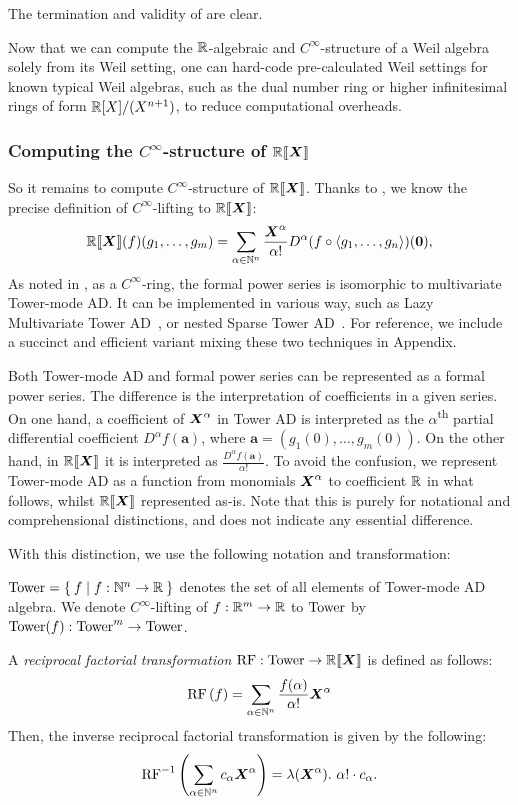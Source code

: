 \documentclass[%
  sigconf,authorversion,screen]{acmart}
\begin{document}
The termination and validity of  are clear.

Now that we can compute the $\mathbb{R}$-algebraic and $C^\infty$-structure of a Weil algebra solely from its Weil setting, one can hard-code pre-calculated Weil settings for known typical Weil algebras, such as the dual number ring or higher infinitesimal rings of form $\mathbb{R}[X]/(X^{n+1})$, to reduce computational overheads.

\subsubsection{Computing the $C^\infty$-structure of $\mathord{\mathbb{R}\llbracket\boldsymbol{X}\rrbracket}$}\label{sec:power-series-lifting}
So it remains to compute $C^\infty$-structure of $\mathord{\mathbb{R}\llbracket\boldsymbol{X}\rrbracket}$.
Thanks to , we know the precise definition of $C^\infty$-lifting to $\mathord{\mathbb{R}\llbracket\boldsymbol{X}\rrbracket}$:
\[
  \mathord{\mathbb{R}\llbracket\boldsymbol{X}\rrbracket}(f)(g_1, \dots, g_m) = \sum_{\alpha \in \mathbb{N}^n} \frac{\boldsymbol{X}^\alpha}{\alpha!} D^\alpha(f \circ \braket{g_1, \dots, g_n})(\boldsymbol{0}),
\]
As noted in , as a $C^\infty$-ring, the formal power series is isomorphic to multivariate Tower-mode AD.
It can be implemented in various way, such as Lazy Multivariate Tower AD~\cite{Pearlmutter:2007aa}, or nested Sparse Tower AD~\cite[{module \texttt{Numeric.AD.Rank1.Sparse}}]{Kmett:2010aa}.
For reference, we include a succinct and efficient variant mixing these two techniques in Appendix.

Both Tower-mode AD and formal power series can be represented as a formal power series.
The difference is the interpretation of coefficients in a given series.
On one hand, a coefficient of $\boldsymbol{X}^\alpha$ in Tower AD is interpreted as the $\alpha$\textsuperscript{th} partial differential coefficient $D^\alpha f(\boldsymbol{a})$, where $\boldsymbol{a} = (g_1(0), \dots, g_m(0))$.
On the other hand, in $\mathord{\mathbb{R}\llbracket\boldsymbol{X}\rrbracket}$ it is interpreted as $\frac{D^\alpha f(\boldsymbol{a})}{\alpha!}$.
To avoid the confusion, we represent Tower-mode AD as a function from monomials $\boldsymbol{X}^\alpha$ to coefficient $\mathbb{R}$ in what follows, whilst $\mathord{\mathbb{R}\llbracket\boldsymbol{X}\rrbracket}$ represented as-is.
Note that this is purely for notational and comprehensional distinctions, and does not indicate any essential difference.

With this distinction, we use the following notation and transformation:

\begin{definition}
  $\mathord{\mathrm{Tower}} = \Set{f | f: \mathbb{N}^n \to \mathbb{R}}$ denotes the set of all elements of Tower-mode AD algebra.
  We denote $C^\infty$-lifting of $f: \mathbb{R}^m \to \mathbb{R}$ to $\mathord{\mathrm{Tower}}$ by $\mathord{\mathrm{Tower}}(f): \mathord{\mathrm{Tower}}^m \to \mathord{\mathrm{Tower}}$.

  A \emph{reciprocal factorial transformation} $\operatorname{RF}: \mathord{\mathrm{Tower}} \to \mathord{\mathbb{R}\llbracket\boldsymbol{X}\rrbracket}$ is defined as follows:
  \[
    \operatorname{RF}\left(f\right)
    = \sum_{\alpha \in \mathbb{N}^n} \frac{f(\alpha)}{\alpha!} \boldsymbol{X}^\alpha
  \]
  Then, the inverse reciprocal factorial transformation is given by the following:
  \[
  \operatorname{RF}^{-1}\left(\sum_{\alpha \in \mathbb{N}^n} c_\alpha \boldsymbol{X}^\alpha\right)
  = \lambda (\boldsymbol{X}^\alpha).\ \alpha ! \cdot c_\alpha.
  \]
\end{definition}
\end{document}
